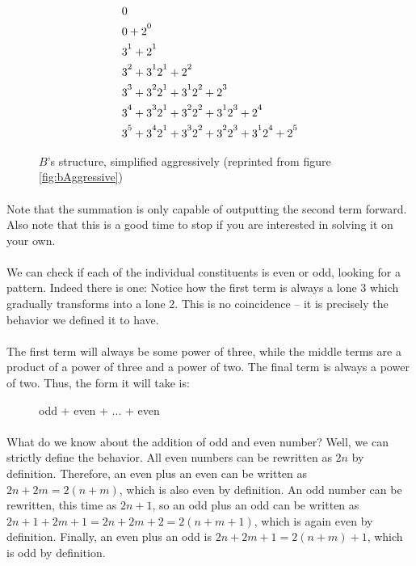\documentclass[12pt,letterpaper]{article}
\begin{document}
			\begin{figure*}[h]
				\begin{align*}
				&0\\
				&0 + 2\strut^0\\
				&3\strut^1 + 2\strut^1\\
				&3\strut^2 + 3\strut^1 2\strut^1 + 2\strut^2\\
				&3\strut^3 + 3\strut^2 2\strut^1 + 3\strut^1 2\strut^2 + 2\strut^3\\
				&3\strut^4 + 3\strut^3 2\strut^1 + 3\strut^2 2\strut^2+ 3\strut^1 2\strut^3 + 2\strut^4\\
				&3\strut^5 + 3\strut^4 2\strut^1 + 3\strut^3 2\strut^2+ 3\strut^2 2\strut^3 + 3\strut^1 2\strut^4 + 2\strut^5
				\end{align*}
				
				\caption*{$B$'s structure, simplified aggressively (reprinted from figure \ref{fig:bAggressive})}
			\end{figure*}
		
			\paragraph{} Note that the summation is only capable of outputting the second term forward. Also note that this is a good time to stop if you are interested in solving it on your own.
			
			\paragraph{} We can check if each of the individual constituents is even or odd, looking for a pattern. Indeed there is one: Notice how the first term is always a lone 3 which gradually transforms into a lone 2. This is no coincidence -- it is precisely the behavior we defined it to have.
			
			\paragraph{} The first term will always be some power of three, while the middle terms are a product of a power of three and a power of two. The final term is always a power of two. Thus, the form it will take is:
			
			\begin{figure*}[h]
				\centering
				odd + even + ... + even
			\end{figure*}
		
			\paragraph{} What do we know about the addition of odd and even number? Well, we can strictly define the behavior. All even numbers can be rewritten as $2n$ by definition. Therefore, an even plus an even can be written as $2n + 2m = 2(n + m)$, which is also even by definition. An odd number can be rewritten, this time as $2n + 1$, so an odd plus an odd can be written as $2n + 1 + 2m + 1 = 2n + 2m + 2 = 2(n + m + 1)$, which is again even by definition. Finally, an even plus an odd is $2n + 2m + 1 = 2(n + m) + 1$, which is odd by definition.
			
\end{document}
